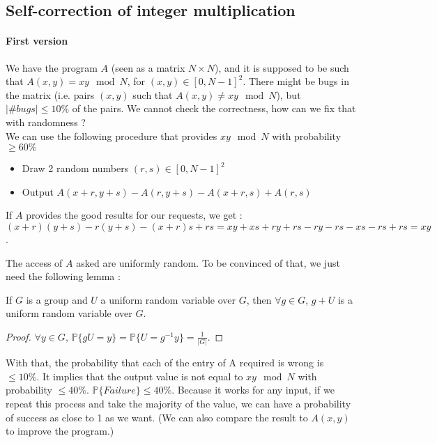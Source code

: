 


\subsection{Self-correction of integer multiplication}
\paragraph{First version}

We have the program $A$ (seen as a matrix $N\times N$), and it is supposed to be such that $A(x,y)=xy\mod N$, for $(x,y)\in[0,N-1]^2$. There might be bugs in the matrix (i.e. pairs $(x,y)$ such that $A(x,y)\ne xy\mod N$), but $|\#bugs|\le10\%$ of the pairs. We cannot check the correctness, how can we fix that with randomness ?\\

We can use the following procedure that provides $xy\mod N$ with probability $\ge60\%$
\begin{itemize}
\item Draw 2 random numbers $(r,s)\in[0,N-1]^2$
\item Output $A(x+r,y+s)-A(r,y+s)-A(x+r,s)+A(r,s)$
\end{itemize}

If $A$ provides the good results for our requests, we get :\\
$(x+r)(y+s)-r(y+s)-(x+r)s+rs=xy+xs+ry+rs-ry-rs-xs-rs+rs=xy$.

The access of $A$ asked are uniformly random. To be convinced of that, we just need the following lemma :

\begin{lemma}
  If $G$ is a group and $U$ a uniform random variable over $G$, then $\forall g\in G$, $g+U$ is a uniform random variable over $G$.
\end{lemma}
\begin{proof}
$\forall y\in G$, $\mathbb{P}\{gU=y\}=\mathbb{P}\{U=g^{-1}y\}=\frac{1}{|G|}$.

\end{proof}

With that, the probability that each of the entry of A required is wrong is $\le 10\%$. It implies that the output value is not equal to $xy\mod N$ with probability $\le 40\%$. $\mathbb{P}\{Failure\}\le 40\%$. Because it works for any input, if we repeat this process and take the majority of the value, we can have a probability of success as close to 1 as we want. (We can also compare the result to $A(x,y)$ to improve the program.)\\




